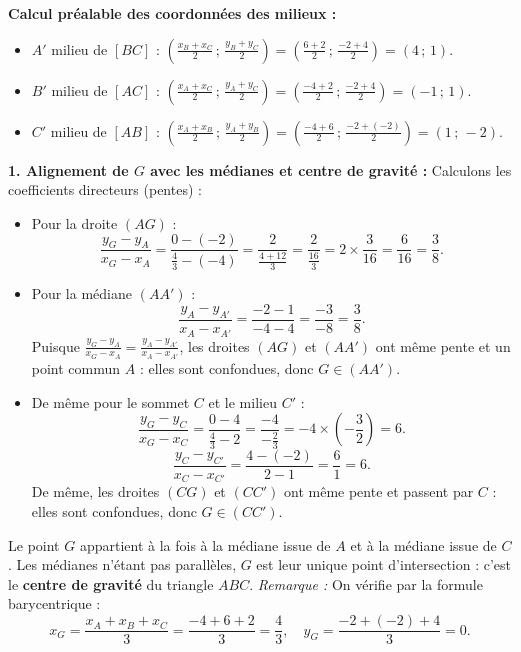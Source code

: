 \documentclass[11pt,a4paper]{article}
\begin{document}
\begin{correctionbox}
\textbf{Calcul préalable des coordonnées des milieux :}
\begin{itemize}[leftmargin=1cm]
    \item $A'$ milieu de $[BC]$ : $\left(\frac{x_B + x_C}{2} \,;\, \frac{y_B + y_C}{2}\right) = \left(\frac{6 + 2}{2} \,;\, \frac{-2 + 4}{2}\right) = (4\,;\,1)$.
    \item $B'$ milieu de $[AC]$ : $\left(\frac{x_A + x_C}{2} \,;\, \frac{y_A + y_C}{2}\right) = \left(\frac{-4 + 2}{2} \,;\, \frac{-2 + 4}{2}\right) = (-1\,;\,1)$.
    \item $C'$ milieu de $[AB]$ : $\left(\frac{x_A + x_B}{2} \,;\, \frac{y_A + y_B}{2}\right) = \left(\frac{-4 + 6}{2} \,;\, \frac{-2 + (-2)}{2}\right) = (1\,;\,-2)$.
\end{itemize}

\textbf{1. Alignement de $G$ avec les médianes et centre de gravité :}
Calculons les coefficients directeurs (pentes) :
\begin{itemize}[leftmargin=1cm]
    \item Pour la droite $(AG)$ :
    \[
    \frac{y_G - y_A}{x_G - x_A} = \frac{0 - (-2)}{\frac{4}{3} - (-4)} = \frac{2}{\frac{4 + 12}{3}} = \frac{2}{\frac{16}{3}} = 2 \times \frac{3}{16} = \frac{6}{16} = \frac{3}{8}.
    \]
    \item Pour la médiane $(AA')$ :
    \[
    \frac{y_A - y_{A'}}{x_A - x_{A'}} = \frac{-2 - 1}{-4 - 4} = \frac{-3}{-8} = \frac{3}{8}.
    \]
    Puisque $\frac{y_G - y_A}{x_G - x_A} = \frac{y_A - y_{A'}}{x_A - x_{A'}}$, les droites $(AG)$ et $(AA')$ ont même pente et un point commun $A$ : elles sont confondues, donc $G \in (AA')$.
    \item De même pour le sommet $C$ et le milieu $C'$ :
    \[
    \frac{y_G - y_C}{x_G - x_C} = \frac{0 - 4}{\frac{4}{3} - 2} = \frac{-4}{-\frac{2}{3}} = -4 \times \left(-\frac{3}{2}\right) = 6.
    \]
    \[
    \frac{y_C - y_{C'}}{x_C - x_{C'}} = \frac{4 - (-2)}{2 - 1} = \frac{6}{1} = 6.
    \]
    De même, les droites $(CG)$ et $(CC')$ ont même pente et passent par $C$ : elles sont confondues, donc $G \in (CC')$.
\end{itemize}
Le point $G$ appartient à la fois à la médiane issue de $A$ et à la médiane issue de $C$. Les médianes n'étant pas parallèles, $G$ est leur unique point d'intersection : c'est le \textbf{centre de gravité} du triangle $ABC$.
\textit{Remarque :} On vérifie par la formule barycentrique :
\[
x_G = \frac{x_A + x_B + x_C}{3} = \frac{-4 + 6 + 2}{3} = \frac{4}{3}, \quad y_G = \frac{-2 + (-2) + 4}{3} = 0.
\]


\end{correctionbox}
\end{document}
